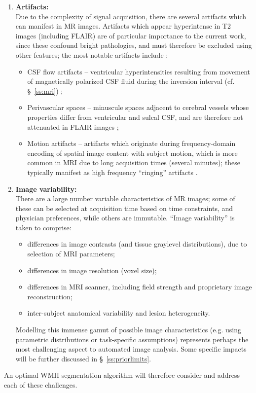 \begin{enumerate}[itemsep=0pt,topsep=0pt]
  \item \label{chauto:artifacts}   \textbf{Artifacts:} \\
  Due to the complexity of signal acquisition, there are several artifacts which can manifest in MR images. Artifacts which appear hyperintense in T2 images (including FLAIR) are of particular importance to the current work, since these confound bright pathologies, and must therefore be excluded using other features; the most notable artifacts include \cite{Wardlaw2015}:
  \begin{itemize}[itemsep=0pt,topsep=0pt]
    \item CSF flow artifacts -- ventricular hyperintensities resulting from movement of magnetically polarized CSF fluid during the inversion interval (cf. \S\ \ref{ss:mri}) \cite{Bakshi2000};
    \item Perivascular spaces -- minuscule spaces adjacent to cerebral vessels whose properties differ from ventricular and sulcal CSF, and are therefore not attenuated in FLAIR images \cite{Wardlaw2015};
    \item Motion artifacts -- artifacts which originate during frequency-domain encoding of spatial image content with subject motion, which is more common in MRI due to long acquisition times (several minutes); these typically manifest as high frequency ``ringing'' artifacts \cite{Zaitsev2015}.
  \end{itemize}
  \item \label{chauto:variability} \textbf{Image variability:} \\
  There are a large number variable characteristics of MR images; some of these can be selected at acquisition time based on time constraints, and physician preferences, while others are immutable. ``Image variability'' is taken to comprise:
  \begin{itemize}[itemsep=0pt,topsep=0pt]
    \item differences in image contrasts (and tissue graylevel distributions), due to selection of MRI parameters;
    \item differences in image resolution (voxel size);
    \item differences in MRI scanner, including field strength and proprietary image reconstruction;
    \item inter-subject anatomical variability and lesion heterogeneity.
  \end{itemize}
  Modelling this immense gamut of possible image characteristics (e.g. using parametric distributions or task-specific assumptions) represents perhaps the most challenging aspect to automated image analysis. Some specific impacts will be further discussed in \S\ \ref{ss:priorlimits}.
\end{enumerate}
An optimal WMH segmentation algorithm will therefore consider and address each of these challenges.
